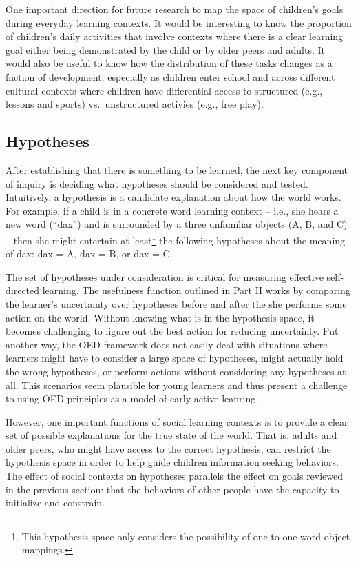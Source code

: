 \documentclass[english,floatsintext,man]{apa6}
\theoremstyle{definition}
\theoremstyle{definition}
\theoremstyle{definition}
\theoremstyle{remark}
\begin{document}
One important direction for future research to map the space of
children's goals during everyday learning contexts. It would be
interesting to know the proportion of children's daily activities that
involve contexts where there is a clear learning goal either being
demonstrated by the child or by older peers and adults. It would also be
useful to know how the distribution of these tasks changes as a fnction
of development, especially as children enter school and across different
cultural contexts where children have differential access to structured
(e.g., lessons and sports) vs.~unstructured activies (e.g., free play).

\subsection{Hypotheses}\label{hypotheses}

After establishing that there is something to be learned, the next key
component of inquiry is deciding what hypotheses should be considered
and tested. Intuitively, a hypothesis is a candidate explanation about
how the world works. For example, if a child is in a concrete word
learning context -- i.e., she hears a new word (\enquote{dax}) and is
surrounded by a three unfamiliar objects (A, B, and C) -- then she might
entertain at least\footnote{This hypothesis space only considers the
  possibility of one-to-one word-object mappings.} the following
hypotheses about the meaning of dax: dax = A, dax = B, or dax = C.

The set of hypotheses under consideration is critical for measuring
effective self-directed learning. The usefulness function outlined in
Part II works by comparing the learner's uncertainty over hypotheses
before and after the she performs some action on the world. Without
knowing what is in the hypothesis space, it becomes challenging to
figure out the best action for reducing uncertainty. Put another way,
the OED framework does not easily deal with situations where learners
might have to consider a large space of hypotheses, might actually hold
the wrong hypotheses, or perform actions without considering any
hypotheses at all. This scenarios seem plausible for young learners and
thus present a challenge to using OED principles as a model of early
active leanring.

However, one important functions of social learning contexts is to
provide a clear set of possible explanations for the true state of the
world. That is, adults and older peers, who might have access to the
correct hypothesis, can restrict the hypothesis space in order to help
guide children information seeking behaviors. The effect of social
contexts on hypotheses parallels the effect on goals reviewed in the
previous section: that the behaviors of other people have the capacity
to initialize and constrain.
\end{document}
